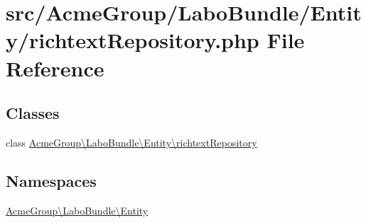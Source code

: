 \hypertarget{richtext_repository_8php}{\section{src/\+Acme\+Group/\+Labo\+Bundle/\+Entity/richtext\+Repository.php File Reference}
\label{richtext_repository_8php}
}
\subsection*{Classes}
\begin{DoxyCompactItemize}
\item 
class \hyperlink{class_acme_group_1_1_labo_bundle_1_1_entity_1_1richtext_repository}{Acme\+Group\textbackslash{}\+Labo\+Bundle\textbackslash{}\+Entity\textbackslash{}richtext\+Repository}
\end{DoxyCompactItemize}
\subsection*{Namespaces}
\begin{DoxyCompactItemize}
\item 
 \hyperlink{namespace_acme_group_1_1_labo_bundle_1_1_entity}{Acme\+Group\textbackslash{}\+Labo\+Bundle\textbackslash{}\+Entity}
\end{DoxyCompactItemize}
